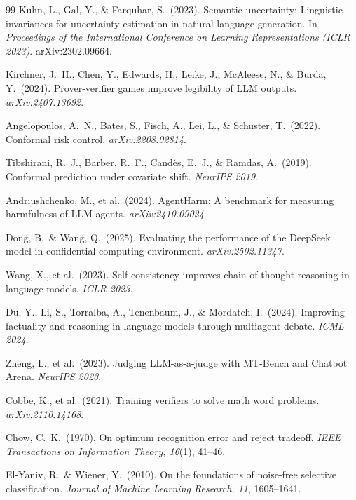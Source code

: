 \documentclass[10pt,twocolumn]{article}
\begin{document}

\begin{thebibliography}{99}
Kuhn, L., Gal, Y., \& Farquhar, S.\ (2023).
Semantic uncertainty: Linguistic invariances for uncertainty estimation in
natural language generation.
In \emph{Proceedings of the International Conference on Learning Representations
(ICLR 2023)}.
arXiv:2302.09664.

Kirchner, J.~H., Chen, Y., Edwards, H., Leike, J., McAleese, N.,
\& Burda, Y.\ (2024).
Prover-verifier games improve legibility of LLM outputs.
\emph{arXiv:2407.13692}.

Angelopoulos, A.\ N., Bates, S., Fisch, A., Lei, L., \& Schuster, T.\ (2022).
Conformal risk control.
\emph{arXiv:2208.02814}.

Tibshirani, R.\ J., Barber, R.\ F., Cand\`es, E.\ J., \& Ramdas, A.\ (2019).
Conformal prediction under covariate shift.
\emph{NeurIPS 2019}.

Andriushchenko, M., et al.\ (2024).
AgentHarm: A benchmark for measuring harmfulness of LLM agents.
\emph{arXiv:2410.09024}.

Dong, B.\ \& Wang, Q.\ (2025).
Evaluating the performance of the DeepSeek model in confidential computing
environment.
\emph{arXiv:2502.11347}.

Wang, X., et al.\ (2023).
Self-consistency improves chain of thought reasoning in language models.
\emph{ICLR 2023}.

Du, Y., Li, S., Torralba, A., Tenenbaum, J., \& Mordatch, I.\ (2024).
Improving factuality and reasoning in language models through multiagent debate.
\emph{ICML 2024}.

Zheng, L., et al.\ (2023).
Judging LLM-as-a-judge with MT-Bench and Chatbot Arena.
\emph{NeurIPS 2023}.

Cobbe, K., et al.\ (2021).
Training verifiers to solve math word problems.
\emph{arXiv:2110.14168}.

Chow, C.\ K.\ (1970).
On optimum recognition error and reject tradeoff.
\emph{IEEE Transactions on Information Theory, 16}(1), 41--46.

El-Yaniv, R.\ \& Wiener, Y.\ (2010).
On the foundations of noise-free selective classification.
\emph{Journal of Machine Learning Research, 11}, 1605--1641.


\end{thebibliography}
\end{document}
